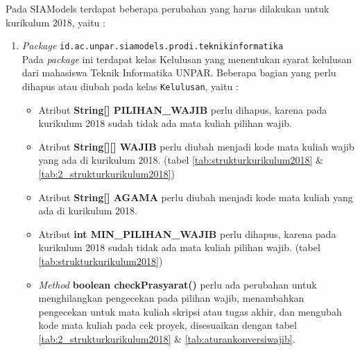 Pada SIAModels terdapat beberapa perubahan yang harus dilakukan untuk kurikulum 2018, yaitu :
\begin{enumerate}
	\item \textit{Package} \texttt{id.ac.unpar.siamodels.prodi.teknikinformatika}\\
	Pada \textit{package} ini terdapat kelas Kelulusan yang menentukan syarat kelulusan dari mahasiswa Teknik Informatika UNPAR. Beberapa bagian yang perlu dihapus atau diubah pada kelas \texttt{Kelulusan}, yaitu :
	\begin{itemize}
		\item Atribut \textbf{String[] PILIHAN\_WAJIB} perlu dihapus, karena pada kurikulum 2018 sudah tidak ada mata kuliah pilihan wajib.
		\item Atribut \textbf{String[][] WAJIB} perlu diubah menjadi kode mata kuliah wajib yang ada di kurikulum 2018. (tabel \ref{tab:strukturkurikulum2018} \& \ref{tab:2_strukturkurikulum2018})
		\item Atribut \textbf{String[] AGAMA} perlu diubah menjadi kode mata kuliah yang ada di kurikulum 2018.
		\item Atribut \textbf{int MIN\_PILIHAN\_WAJIB} perlu dihapus, karena pada kurikulum 2018 sudah tidak ada mata kuliah pilihan wajib. (tabel \ref{tab:strukturkurikulum2018})
		\item \textit{Method} \textbf{boolean checkPrasyarat()} perlu ada perubahan untuk menghilangkan pengecekan pada pilihan wajib, menambahkan pengecekan untuk mata kuliah skripsi atau tugas akhir, dan mengubah kode mata kuliah pada cek proyek, disesuaikan dengan tabel \ref{tab:2_strukturkurikulum2018} \& \ref{tab:aturankonversiwajib}.
	\end{itemize}
		

\end{enumerate}
